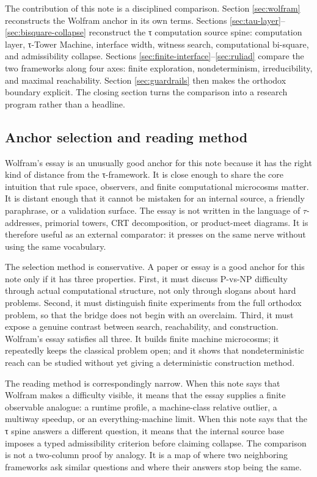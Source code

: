 \documentclass{pantarhei-researchnote}
\begin{document}
The contribution of this note is a disciplined comparison. Section
\ref{sec:wolfram} reconstructs the Wolfram anchor in its own terms.
Sections \ref{sec:tau-layer}--\ref{sec:bisquare-collapse} reconstruct the
τ computation source spine: computation layer, τ-Tower Machine, interface
width, witness search, computational bi-square, and admissibility
collapse. Sections \ref{sec:finite-interface}--\ref{sec:ruliad} compare
the two frameworks along four axes: finite exploration, nondeterminism,
irreducibility, and maximal reachability. Section \ref{sec:guardrails}
then makes the orthodox boundary explicit. The closing section turns the
comparison into a research program rather than a headline.

\subsection{Anchor selection and reading method}

Wolfram's essay is an unusually good anchor for this note because it has
the right kind of distance from the τ-framework. It is close enough to
share the core intuition that rule space, observers, and finite
computational microcosms matter. It is distant enough that it cannot be
mistaken for an internal source, a friendly paraphrase, or a validation
surface. The essay is not written in the language of \(\tau\)-addresses,
primorial towers, CRT decomposition, or product-meet diagrams. It is
therefore useful as an external comparator: it presses on the same nerve
without using the same vocabulary.

The selection method is conservative. A paper or essay is a good anchor
for this note only if it has three properties. First, it must discuss
P-vs-NP difficulty through actual computational structure, not only
through slogans about hard problems. Second, it must distinguish finite
experiments from the full orthodox problem, so that the bridge does not
begin with an overclaim. Third, it must expose a genuine contrast between
search, reachability, and construction. Wolfram's essay satisfies all
three. It builds finite machine microcosms; it repeatedly keeps the
classical problem open; and it shows that nondeterministic reach can be
studied without yet giving a deterministic construction method.

The reading method is correspondingly narrow. When this note says that
Wolfram makes a difficulty visible, it means that the essay supplies a
finite observable analogue: a runtime profile, a machine-class relative
outlier, a multiway speedup, or an everything-machine limit. When this
note says that the τ spine answers a different question, it means that
the internal source base imposes a typed admissibility criterion before
claiming collapse. The comparison is not a two-column proof by analogy.
It is a map of where two neighboring frameworks ask similar questions and
where their answers stop being the same.
\end{document}

